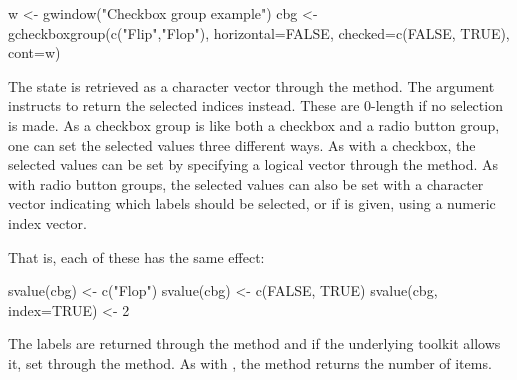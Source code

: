 \begin{Schunk}
\begin{Sinput}
 w <- gwindow("Checkbox group example")
 cbg <- gcheckboxgroup(c("Flip","Flop"), horizontal=FALSE, 
                       checked=c(FALSE, TRUE), cont=w)
 
\end{Sinput}
\end{Schunk}
%


The state is retrieved as a character vector through the
 method. The  argument
instructs  to return the selected indices instead. These
are $0$-length if no selection is made. As a checkbox group is like
both a checkbox and a radio button group, one can set the selected
values three different ways. As with a checkbox, the selected values
can be set by specifying a logical vector through the
 method. As with radio button
groups, the selected values can also be set with a character vector
indicating which labels should be selected, or if  is
given, using a numeric index vector.


That is, each of these has the same effect:
\begin{Schunk}
\begin{Sinput}
 svalue(cbg) <- c("Flop")
 svalue(cbg) <- c(FALSE, TRUE)
 svalue(cbg, index=TRUE) <- 2
\end{Sinput}
\end{Schunk}

The labels are returned through the \method{[}{gcheckboxgroup} method
and if the underlying toolkit allows it, set through the
\method{[\ASSIGN}{gcheckboxgroup} method. As with ,
the  method returns the number of items.






